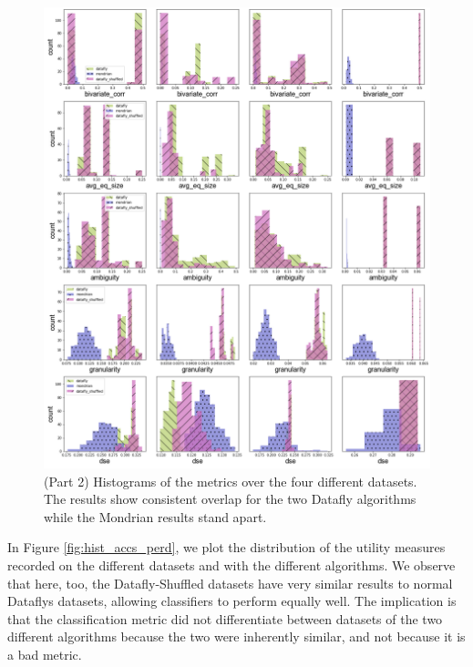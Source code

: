 \begin{figure}
    \centerfloat
    \includegraphics[width=\textwidth]{project/fig/metrics_hist_2.png}
    \caption{(Part 2) Histograms of the metrics over the four different datasets. The results show consistent overlap for the two Datafly algorithms while the Mondrian results stand apart.}
    \label{fig:metric_hist2}
\end{figure}

In Figure \ref{fig:hist_accs_perd}, we plot the distribution of the utility measures recorded on the different datasets and with the different algorithms. We observe that here, too, the Datafly-Shuffled datasets have very similar results to normal Dataflys datasets, allowing classifiers to perform equally well. The implication is that the classification metric did not differentiate between datasets of the two different algorithms because the two were inherently similar, and not because it is a bad metric.

